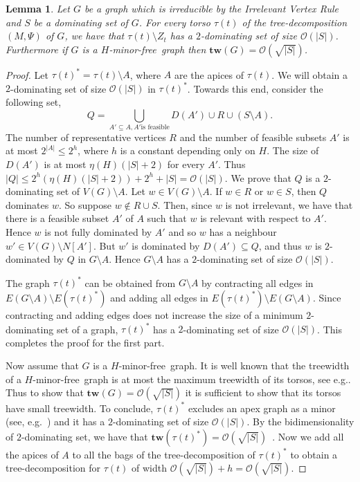 \documentclass[11pt]{article}
\newtheorem{lemma}{Lemma}
\newcommand{\tw}{{\mathbf{tw}}}
\newcommand{\Hmf}{$H$-minor-free}
\newcommand{\cO}{\mathcal{O}}
\begin{document}
\begin{lemma}
\label{lem:dstwbound} Let $G$ be a graph which is irreducible by the Irrelevant Vertex Rule and $S$ be a dominating set of $G$. 
For every torso $\tau(t)$ of the tree-decomposition $(M,\Psi)$ of $G$, we have that $\tau(t)\setminus Z_t$ 
has a $2$-dominating set of size $\cO(|S|)$. Furthermore if $G$ is a \Hmf \, graph then $\tw(G)=\cO(\sqrt{|S|})$. 
\end{lemma}
\begin{proof}
Let $\tau(t)^*= \tau(t) \setminus A$, where $A$ are the apices of $\tau(t)$. We will obtain a $2$-dominating set of size $\cO(|S|)$ in $\tau(t)^*$. Towards this end, consider the following set, $$Q=\bigcup_{A' \subseteq A, A' \text{is feasible} }D(A')\cup R\cup (S \setminus A).$$ 
The number of   representative vertices $R$ and the number of feasible subsets $A'$ 
 is at most $2^{|A|}\leq 2^h$, where $h$ is a constant depending only on $H$. The size of $D(A')$ is at most $\eta(H)(|S|+2)$ for every $A'$. Thus  $|Q|\leq 2^h (\eta(H)(|S|+2)) + 2^h + |S|=\cO(|S|)$. We prove that $Q$ is a $2$-dominating set of $V(G) \setminus A$. Let $w \in V(G) \setminus A$. If $w \in R$ or $w \in S$, then $Q$ dominates $w$. So suppose $w \notin R \cup S$. Then, since $w$ is not irrelevant, we have that  there is a feasible subset $A'$ of $A$ such that $w$ is relevant with respect to $A'$. Hence $w$ is not fully dominated by $A'$ and so $w$ has a neighbour $w' \in V(G) \setminus N[A']$. But $w'$ is dominated by $D(A') \subseteq Q$, and thus $w$ is $2$-dominated by $Q$ in $G \setminus A$. Hence $G \setminus A$ has a $2$-dominating set of size $\cO(|S|)$.

The graph $\tau(t)^*$ can be obtained from $G \setminus A$ by contracting all edges in $E(G \setminus A) \setminus E(\tau(t)^*)$ and adding all edges in $E(\tau(t)^*) \setminus E(G \setminus A)$. Since contracting and adding edges does  not increase the size of a minimum $2$-dominating set of a graph, $\tau(t)^*$ has a $2$-dominating set of size $\cO(|S|)$. This completes the proof for the first part.

Now assume that $G$ is a \Hmf \, graph. It is well known  that the treewidth of a \Hmf \, graph is at most the maximum treewidth of its torsos, see e.g.\cite{DemaineFHT05sub}. Thus to show that $\tw(G)=\cO(\sqrt{|S|})$ it is sufficient to show that its torsos have small treewidth.  To conclude, $\tau(t)^*$ excludes an apex graph as a minor  (see, e.g.~\cite[Theorem $13$]{Grohe03}) and it has a $2$-dominating set of size $\cO(|S|)$. By the bidimensionality of $2$-dominating set, we have that $\tw(\tau(t)^*)=\cO(\sqrt{|S|})$~\cite{DemaineFHT05sub,FominGT09con}. Now we add all the apices of $A$ to all the bags of the tree-decomposition  of $\tau(t)^*$ to obtain a tree-decomposition for $\tau(t)$ of width   $ \cO(\sqrt{|S|})+h =\cO(\sqrt{|S|})$.  
\end{proof}
\end{document}
